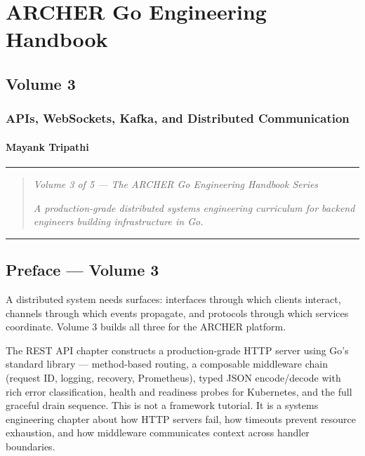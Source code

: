 \documentclass[
]{article}
\author{}
\date{}
\begin{document}
\hypertarget{archer-go-engineering-handbook}{%
\section{ARCHER Go Engineering
Handbook}\label{archer-go-engineering-handbook}}

\hypertarget{volume-3}{%
\subsection{Volume 3}\label{volume-3}}

\hypertarget{apis-websockets-kafka-and-distributed-communication}{%
\subsubsection{APIs, WebSockets, Kafka, and Distributed
Communication}\label{apis-websockets-kafka-and-distributed-communication}}

\hypertarget{mayank-tripathi}{%
\paragraph{Mayank Tripathi}\label{mayank-tripathi}}

\begin{center}\rule{0.5\linewidth}{0.5pt}\end{center}

\begin{quote}
\emph{Volume 3 of 5 --- The ARCHER Go Engineering Handbook Series}

\emph{A production-grade distributed systems engineering curriculum for
backend engineers building infrastructure in Go.}
\end{quote}

\begin{center}\rule{0.5\linewidth}{0.5pt}\end{center}

\hypertarget{preface-volume-3}{%
\subsection{Preface --- Volume 3}\label{preface-volume-3}}

A distributed system needs surfaces: interfaces through which clients
interact, channels through which events propagate, and protocols through
which services coordinate. Volume 3 builds all three for the ARCHER
platform.

The REST API chapter constructs a production-grade HTTP server using
Go's standard library --- method-based routing, a composable middleware
chain (request ID, logging, recovery, Prometheus), typed JSON
encode/decode with rich error classification, health and readiness
probes for Kubernetes, and the full graceful drain sequence. This is not
a framework tutorial. It is a systems engineering chapter about how HTTP
servers fail, how timeouts prevent resource exhaustion, and how
middleware communicates context across handler boundaries.
\end{document}
